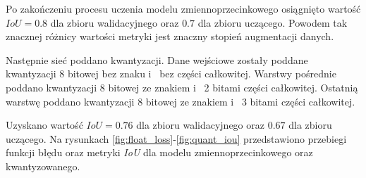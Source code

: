 Po zakończeniu procesu uczenia modelu zmiennoprzecinkowego osiągnięto wartość $IoU = 0.8$ dla zbioru walidacyjnego oraz $0.7$ dla zbioru uczącego. 
Powodem tak znacznej różnicy wartości metryki jest znaczny stopień augmentacji danych.

Następnie sieć poddano kwantyzacji. 
Dane wejściowe zostały poddane kwantyzacji 8 bitowej bez znaku i~ bez części całkowitej.
Warstwy pośrednie poddano kwantyzacji 8 bitowej ze znakiem i~ 2 bitami części całkowitej.
Ostatnią warstwę poddano kwantyzacji 8 bitowej ze znakiem i~ 3 bitami części całkowitej.

Uzyskano wartość $IoU = 0.76$ dla zbioru walidacyjnego oraz $0.67$ dla zbioru uczącego.
Na rysunkach \ref{fig:float_loss}-\ref{fig:quant_iou} przedstawiono przebiegi funkcji błędu oraz metryki \emph{IoU} dla modelu zmiennoprzecinkowego oraz kwantyzowanego.

